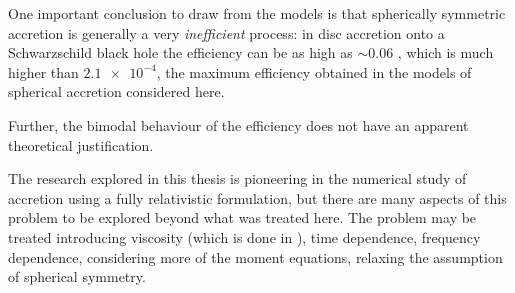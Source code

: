 \documentclass[main.tex]{subfiles}
\begin{document}
One important conclusion to draw from the models is that spherically symmetric accretion is generally a very \emph{inefficient} process: in disc accretion onto a Schwarzschild black hole the efficiency can be as high as \(\sim \num{0.06}\) \cite[eq. 2.8.5]{Nobili:2000}, which is much higher than \(\num{2.1e-4}\), the maximum efficiency obtained in the models of spherical accretion considered here.

Further, the bimodal behaviour of the efficiency does not have an apparent theoretical justification.

The research explored in this thesis is pioneering in the numerical study of accretion using a fully relativistic formulation, but there are many aspects of this problem to be explored beyond what was treated here.
The problem may be treated introducing viscosity (which is done in \cite[]{TurollaNobili:1989}), time dependence, frequency dependence, considering more of the moment equations, relaxing the assumption of spherical symmetry.
\end{document}

